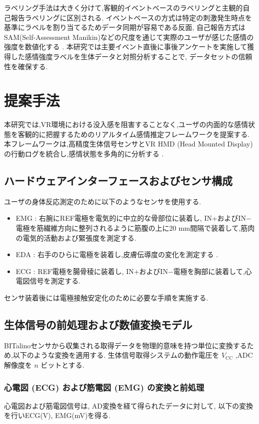 \documentclass[book,paper=a4,fontsize=10pt,jafontscale=0.92]{jlreq}
\begin{document}
ラベリング手法は大きく分けて,客観的イベントベースのラベリングと主観的自己報告ラベリングに区別される.
イベントベースの方式は特定の刺激発生時点を基準にラベルを割り当てるためデータ同期が容易である反面,
自己報告方式はSAM(Self-Assessment Manikin)などの尺度を通じて実際のユーザが感じた感情の強度を数値化する \cite{MarinMorales2020, Liao2020DesignAE}.
本研究では主要イベント直後に事後アンケートを実施して獲得した感情強度ラベルを生体データと対照分析することで,
データセットの信頼性を確保する.


\chapter{提案手法}

本研究では,VR環境における没入感を阻害することなく,ユーザの内面的な感情状態を客観的に把握するためのリアルタイム感情推定フレームワークを提案する.本フレームワークは,高精度生体信号センサとVR HMD (Head Mounted Display) の行動ログを統合し,感情状態を多角的に分析する \cite{MarinMorales2020}.

\section{ハードウェアインターフェースおよびセンサ構成}
ユーザの身体反応測定のために以下のようなセンサを使用する.
\begin{itemize}
\item EMG : 右腕にREF電極を電気的に中立的な骨部位に装着し, IN+およびIN$-$電極を筋繊維方向に整列されるように筋腹の上に20 mm間隔で装着して,筋肉の電気的活動および緊張度を測定する.
\item EDA : 右手のひらに電極を装着し,皮膚伝導度の変化を測定する \cite{Hinkle2019}.
\item ECG : REF電極を腸骨稜に装着し, IN+およびIN$-$電極を胸部に装着して,心電図信号を測定する.
\end{itemize}
センサ装着後には電極接触安定化のために必要な手順を実施する.


\section{生体信号の前処理および数値変換モデル}
BITalinoセンサから収集される取得データを物理的意味を持つ単位に変換するため,以下のような変換を適用する.
生体信号取得システムの動作電圧を $V_{\mathrm{CC}}$ ,ADC解像度を $n$ ビットとする.

\subsection{心電図 (ECG) および筋電図 (EMG) の変換と前処理}
心電図および筋電図信号は, AD変換を経て得られたデータに対して, 以下の変換を行いECG(V), EMG(mV)を得る.
\end{document}
